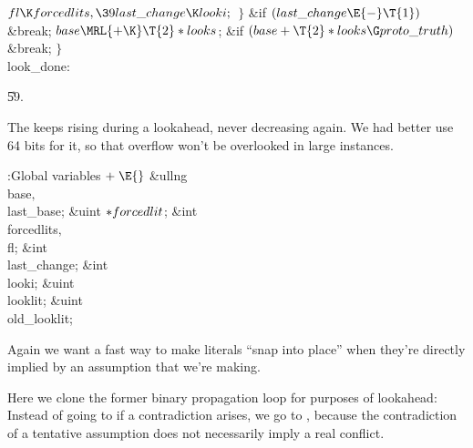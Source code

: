 ${}\\{fl}\K\\{forcedlits},\39\\{last\_change}\K\\{looki};{}$\2\6
\4${}\}{}$\2\6
\&{if} ${}(\\{last\_change}\E{-}\T{1}){}$\1\5
\&{break};\2\6
${}\\{base}\MRL{+{\K}}\T{2}*\\{looks}{}$;\6
\&{if} ${}(\\{base}+\T{2}*\\{looks}\G\\{proto\_truth}){}$\1\5
\&{break};\2\6
\4${}\}{}$\2\6
\\{look\_done}:\par
\U59.\fi

The  keeps rising during a lookahead, never
decreasing again.
We had better use 64 bits for it, so that overflow won't be overlooked
in large instances.

\Y\B\4:Global variables\X${}\mathrel+\E{}$\6
\&{ullng} \\{base}${},{}$ \\{last\_base};\6
\&{uint} ${}{*}\\{forcedlit}{}$;\6
\&{int} \\{forcedlits}${},{}$ \\{fl};\6
\&{int} \\{last\_change};\6
\&{int} \\{looki};\6
\&{uint} \\{looklit};\6
\&{uint} \\{old\_looklit};\par
\fi

Again we want a fast way to make literals ``snap into
place'' when they're directly implied by an assumption that we're making.

Here we clone the former binary propagation loop for purposes of lookahead:
Instead of going to  if a contradiction arises, we go to ,
because the contradiction of a tentative assumption does not
necessarily imply a real conflict.

